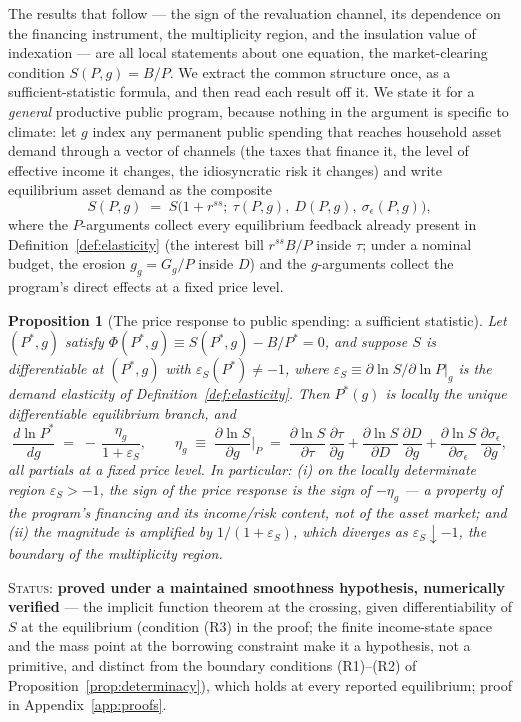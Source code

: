 \documentclass[12pt]{article}
\newtheorem{proposition}{Proposition}
\newcommand{\Sfun}{S}
\begin{document}
The results that follow --- the sign of the revaluation channel, its
dependence on the financing instrument, the multiplicity region, and the
insulation value of indexation --- are all local statements about one
equation, the market-clearing condition $\Sfun(P,g)=B/P$. We extract the
common structure once, as a sufficient-statistic formula, and then read
each result off it. We state it for a \emph{general} productive
public program, because nothing in the argument is specific to climate: let
$g$ index any permanent public spending that reaches household asset demand
through a vector of channels (the taxes that finance it, the level of
effective income it changes, the idiosyncratic risk it changes) and write
equilibrium asset demand as the composite
\begin{equation}
\Sfun(P,g) \;=\;
\Sfun\!\big(1+r^{ss};\ \tau(P,g),\ D(P,g),\ \sigma_\epsilon(P,g)\big),
\label{eq:Scomposite}
\end{equation}
where the $P$-arguments collect every equilibrium feedback already present in
Definition~\ref{def:elasticity} (the interest bill $r^{ss}B/P$ inside
$\tau$; under a nominal budget, the erosion $g_g=G_g/P$ inside $D$) and the
$g$-arguments collect the program's direct effects at a fixed price level.

\begin{proposition}[The price response to public spending: a sufficient
statistic]\label{prop:suffstat}
Let $(P^{*},g)$ satisfy $\Phi(P^{*},g)\equiv\Sfun(P^{*},g)-B/P^{*}=0$, and
suppose $\Sfun$ is differentiable at $(P^{*},g)$ with
$\varepsilon_S(P^{*})\neq-1$, where
$\varepsilon_S\equiv\partial\ln\Sfun/\partial\ln P|_{g}$ is the demand
elasticity of Definition~\ref{def:elasticity}. Then $P^{*}(g)$ is locally the
unique differentiable equilibrium branch, and
\begin{equation}
\frac{d\ln P^{*}}{dg}
\;=\;
-\,\frac{\eta_g}{1+\varepsilon_S},
\qquad
\eta_g \;\equiv\; \frac{\partial\ln \Sfun}{\partial g}\Big|_{P}
\;=\;
\frac{\partial\ln\Sfun}{\partial\tau}\,\frac{\partial\tau}{\partial g}
+\frac{\partial\ln\Sfun}{\partial D}\,\frac{\partial D}{\partial g}
+\frac{\partial\ln\Sfun}{\partial\sigma_\epsilon}\,
 \frac{\partial\sigma_\epsilon}{\partial g},
\label{eq:suffstat}
\end{equation}
all partials at a fixed price level.
In particular: (i) on the locally determinate region $\varepsilon_S>-1$, the
\emph{sign} of the price response is the sign of $-\eta_g$ --- a property of
the program's financing and its income/risk content, not of the asset
market; and (ii) the magnitude is amplified by $1/(1+\varepsilon_S)$,
which diverges as $\varepsilon_S\downarrow-1$, the boundary of the
multiplicity region.
\end{proposition}
\noindent\textsc{Status:} \textbf{proved under a maintained smoothness
hypothesis, numerically verified} --- the implicit function theorem at the
crossing, given differentiability of $\Sfun$ at the equilibrium (condition
(R3) in the proof; the finite income-state space and the mass point at the
borrowing constraint make it a
hypothesis, not a primitive, and distinct from the boundary conditions
(R1)--(R2) of Proposition~\ref{prop:determinacy}), which holds at every
reported equilibrium; proof in
Appendix~\ref{app:proofs}.
\end{document}
